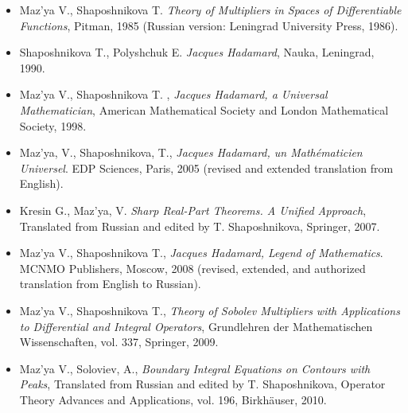 \documentclass{article}
\begin{document}

\begin{itemize}
         \item Maz'ya V., Shaposhnikova T. {\it Theory of Multipliers
in Spaces of
               Differentiable Functions}, Pitman, 1985 (Russian
               version: Leningrad University Press, 1986).
         \item Shaposhnikova T., Polyshchuk E. {\it Jacques Hadamard}, Nauka,
               Leningrad, 1990.
         \item Maz'ya V., Shaposhnikova T. , {\it Jacques Hadamard, a Universal
               Mathematician}, American Mathematical Society and
               London Mathematical Society, 1998.
         \item Maz'ya, V., Shaposhnikova, T.,
{\it Jacques Hadamard, un Math\'ematicien Universel}. EDP Sciences, Paris, 2005
(revised and extended translation from English).
         \item Kresin G., Maz'ya, V. {\it Sharp Real-Part Theorems. A Unified Approach}, Translated from Russian and edited by T. Shaposhnikova, Springer, 2007.
         \item Maz'ya V., Shaposhnikova T., {\it Jacques Hadamard, Legend of  Mathematics}. MCNMO Publishers, Moscow, 2008 (revised,  extended, and  authorized translation from English to Russian).
\item Maz'ya V., Shaposhnikova T., {\it Theory of Sobolev Multipliers with Applications to Differential and Integral Operators}, Grundlehren der Mathematischen Wissenschaften, vol. 337, Springer, 2009.
\item Maz'ya V.,  Soloviev, A., {\it Boundary Integral Equations on Contours with Peaks}, Translated from Russian and edited by T. Shaposhnikova,
Operator Theory Advances and Applications, vol. 196, Birkh\"auser, 2010.



\end{itemize}
\end{document}
